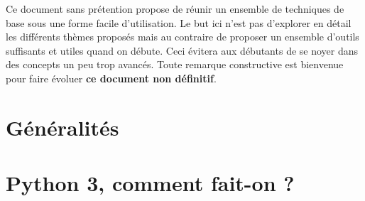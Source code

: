 \documentclass[a4,11pt]{article}
\begin{document}

Ce document sans prétention propose de réunir un ensemble de techniques de base sous une forme facile d'utilisation.
Le but ici n'est pas d'explorer en détail les différents thèmes proposés mais au contraire de proposer un ensemble d'outils suffisants et utiles quand on débute.
Ceci évitera aux débutants de se noyer dans des concepts un peu trop avancés.
Toute remarque constructive est bienvenue pour faire évoluer \textbf{\textbf{ce document non définitif}}.


\section{Généralités}







\section{Python 3, comment fait-on ?}

















\end{document}
